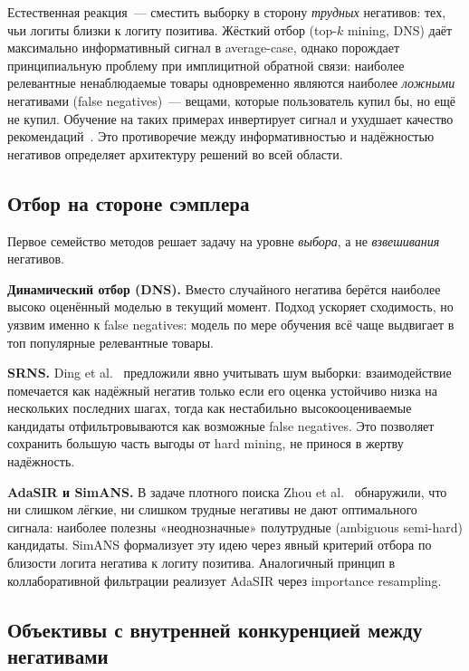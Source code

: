 Естественная реакция~--- сместить выборку в сторону \emph{трудных} негативов: тех, чьи логиты
близки к логиту позитива. Жёсткий отбор (top-$k$ mining, DNS) даёт максимально информативный сигнал
в average-case, однако порождает принципиальную проблему при имплицитной обратной связи: наиболее
релевантные ненаблюдаемые товары одновременно являются наиболее \emph{ложными} негативами
(false negatives)~--- вещами, которые пользователь купил бы, но ещё не купил. Обучение на
таких примерах инвертирует сигнал и ухудшает качество рекомендаций~\cite{ding2020srns}. Это
противоречие между информативностью и надёжностью негативов определяет архитектуру решений во всей
области.

\subsection{Отбор на стороне сэмплера}
\label{subsec:ch1:sampler_side}

Первое семейство методов решает задачу на уровне \emph{выбора}, а не \emph{взвешивания} негативов.

\textbf{Динамический отбор (DNS).} Вместо случайного негатива берётся наиболее высоко оценённый
моделью в текущий момент. Подход ускоряет сходимость, но уязвим именно к false negatives: модель
по мере обучения всё чаще выдвигает в топ популярные релевантные товары.

\textbf{SRNS.} Ding et al.~\cite{ding2020srns} предложили явно учитывать шум выборки:
взаимодействие помечается как надёжный негатив только если его оценка устойчиво низка на нескольких
последних шагах, тогда как нестабильно высокооцениваемые кандидаты отфильтровываются как возможные
false negatives. Это позволяет сохранить большую часть выгоды от hard mining, не принося в жертву
надёжность.

\textbf{AdaSIR и SimANS.} В задаче плотного поиска Zhou et al.~\cite{zhou2022simans} обнаружили, что
ни слишком лёгкие, ни слишком трудные негативы не дают оптимального сигнала: наиболее полезны
«неоднозначные» полутрудные (ambiguous semi-hard) кандидаты. SimANS формализует эту идею через
явный критерий отбора по близости логита негатива к логиту позитива. Аналогичный принцип в
коллаборативной фильтрации реализует AdaSIR через importance resampling.

\subsection{Объективы с внутренней конкуренцией между негативами}
\label{subsec:ch1:competitive_obj}

